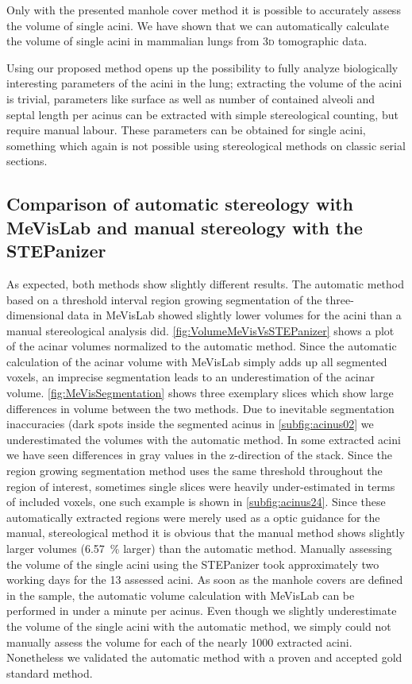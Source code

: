 \documentclass[%
	paper=a4,%
	abstract=true,%
	]{scrartcl}
\newcommand{\threed}{3\textsc{d}\xspace}
\begin{document}
Only with the presented manhole cover method it is possible to accurately assess the volume of single acini. We have shown that we can automatically calculate the volume of single acini in mammalian lungs from \threed tomographic data.

Using our proposed method opens up the possibility to fully analyze biologically interesting parameters of the acini in the lung; extracting the volume of the acini is trivial, parameters like surface as well as number of contained alveoli and septal length per acinus can be extracted with simple stereological counting, but require manual labour. These parameters can be obtained for single acini, something which again is not possible using stereological methods on classic serial sections.

\subsection{Comparison of automatic stereology with MeVisLab and manual stereology with the STEPanizer\label{subsec:MeVisVsSTEPanizer}}
As expected, both methods show slightly different results. The automatic method based on a threshold interval region growing segmentation of the three-dimensional data in MeVisLab showed slightly lower volumes for the acini than a manual stereological analysis did. \autoref{fig:VolumeMeVisVsSTEPanizer} shows a plot of the acinar volumes normalized to the automatic method. Since the automatic calculation of the acinar volume with MeVisLab simply adds up all segmented voxels, an imprecise segmentation leads to an underestimation of the acinar volume. \autoref{fig:MeVisSegmentation} shows three exemplary slices which show large differences in volume between the two methods. Due to inevitable segmentation inaccuracies (dark spots inside the segmented acinus in \autoref{subfig:acinus02} we underestimated the volumes with the automatic method. In some extracted acini we have seen differences in gray values in the z-direction of the stack. Since the region growing segmentation method uses the same threshold throughout the region of interest, sometimes single slices were heavily under-estimated in terms of included voxels, one such example is shown in \autoref{subfig:acinus24}. Since these automatically extracted regions were merely used as a optic guidance for the manual, stereological method it is obvious that the manual method shows slightly larger volumes (\SI{6.57}{\percent} larger) than the automatic method. Manually assessing the volume of the single acini using the STEPanizer took approximately two working days for the 13 assessed acini. As soon as the manhole covers are defined in the sample, the automatic volume calculation with MeVisLab can be performed in under a minute per acinus. Even though we slightly underestimate the volume of the single acini with the automatic method, we simply could not manually assess the volume for each of the nearly 1000 extracted acini. Nonetheless we validated the automatic method with a proven and accepted gold standard method.
\end{document}
